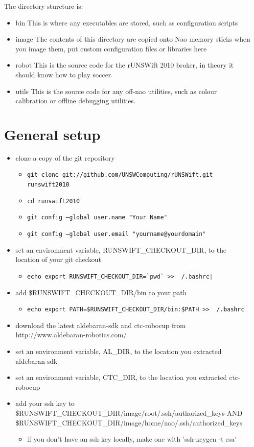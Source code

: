 \documentclass[pdftex,11pt,a4paper]{report}
\begin{document}
The directory sturcture is:
\begin{itemize}
  \item{bin}
    This is where any executables are stored, such as configuration scripts
  \item{image}
    The contents of this directory are copied onto Nao memory sticks when
    you image them, put custom configuration files or libraries here
  \item{robot}
    This is the source code for the rUNSWift 2010 broker, in theory it should
    know how to play soccer.
  \item{utils}
    This is the source code for any off-nao utilities, such as colour
    calibration or offline debugging utilities.
\end{itemize}

\section{General setup}

\begin{itemize}
\item{clone a copy of the git repository}
  \begin{itemize}
    \item{\texttt{git clone git://github.com/UNSWComputing/rUNSWift.git runswift2010}}
    \item{\texttt{cd runswift2010}}
    \item{\texttt{git config --global user.name "Your Name"}}
    \item{\texttt{git config --global user.email "yourname@yourdomain"}}
  \end{itemize}
\item{set an environment variable, RUNSWIFT\_CHECKOUT\_DIR, to the location of your git checkout}
  \begin{itemize}\item{\texttt{echo export RUNSWIFT\_CHECKOUT\_DIR=\`{}pwd\`{} >> ~/.bashrc|}}\end{itemize}
\item{add \$RUNSWIFT\_CHECKOUT\_DIR/bin to your path}
  \begin{itemize}\item{\texttt{echo export PATH=\$RUNSWIFT\_CHECKOUT\_DIR/bin:\$PATH >> ~/.bashrc}}\end{itemize}
\item{download the latest aldebaran-sdk and ctc-robocup from http://www.aldebaran-robotics.com/}
\item{set an environment variable, AL\_DIR, to the location you extracted aldebaran-sdk}
\item{set an environment variable, CTC\_DIR, to the location you extracted ctc-robocup} 
\item{add your ssh key to \$RUNSWIFT\_CHECKOUT\_DIR/image/root/.ssh/authorized\_keys AND \$RUNSWIFT\_CHECKOUT\_DIR/image/home/nao/.ssh/authorized\_keys}
  \begin{itemize}\item{if you don't have an ssh key locally, make one with 'ssh-keygen -t rsa'}\end{itemize}
\end{itemize}
\end{document}
